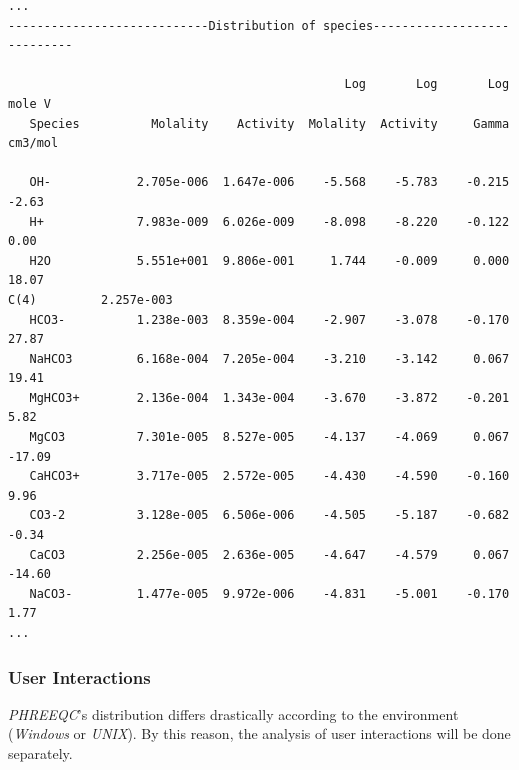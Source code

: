 \documentclass[ppgc,mestrado,english]{iiufrgs}
\begin{document}
{\sloppy
\begin{lstlisting}[frame=single, caption=\emph{PHREEQC}'s excerpt from the output file, label=phreeqc:output]
...
----------------------------Distribution of species----------------------------
 
                                               Log       Log       Log    mole V
   Species          Molality    Activity  Molality  Activity     Gamma   cm3/mol
 
   OH-            2.705e-006  1.647e-006    -5.568    -5.783    -0.215     -2.63
   H+             7.983e-009  6.026e-009    -8.098    -8.220    -0.122      0.00
   H2O            5.551e+001  9.806e-001     1.744    -0.009     0.000     18.07
C(4)         2.257e-003
   HCO3-          1.238e-003  8.359e-004    -2.907    -3.078    -0.170     27.87
   NaHCO3         6.168e-004  7.205e-004    -3.210    -3.142     0.067     19.41
   MgHCO3+        2.136e-004  1.343e-004    -3.670    -3.872    -0.201      5.82
   MgCO3          7.301e-005  8.527e-005    -4.137    -4.069     0.067    -17.09
   CaHCO3+        3.717e-005  2.572e-005    -4.430    -4.590    -0.160      9.96
   CO3-2          3.128e-005  6.506e-006    -4.505    -5.187    -0.682     -0.34
   CaCO3          2.256e-005  2.636e-005    -4.647    -4.579     0.067    -14.60
   NaCO3-         1.477e-005  9.972e-006    -4.831    -5.001    -0.170      1.77
...
\end{lstlisting}}

\subsubsection{User Interactions}
\emph{PHREEQC}'s distribution differs drastically according to the environment (\emph{Windows} or \emph{UNIX}). By this reason, the analysis of user interactions will be done separately.
\end{document}

